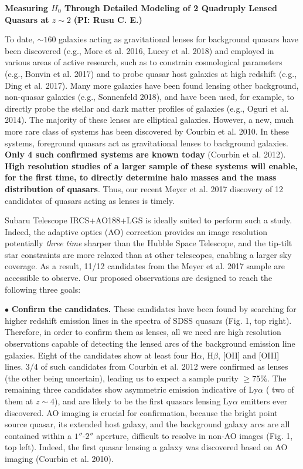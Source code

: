 \documentclass[a4paper,11pt]{article}
\begin{document}
\begin {centering}
{\bf Measuring $H_0$ Through Detailed Modeling of 2 Quadruply Lensed Quasars at $z\sim2$} {\bf (PI: Rusu C. E.)}\\
 \end{centering}
 
\medskip

To date, $\sim160$ galaxies acting as gravitational lenses for background quasars have been discovered (e.g., More et al. 2016, Lucey et al. 2018) and employed in various areas of active research, such as to constrain cosmological parameters (e.g., Bonvin et al. 2017) and to probe quasar host galaxies at high redshift (e.g., Ding et al. 2017). Many more galaxies have been found lensing other background, non-quasar galaxies (e.g., Sonnenfeld 2018), and have been used, for example, to directly probe the stellar and dark matter profiles of galaxies (e.g., Oguri et al. 2014). The majority of these lenses are elliptical galaxies. However, a new, much more rare class of systems has been discovered by Courbin et al. 2010. In these systems, foreground quasars act as gravitational lenses to background galaxies. {\bf Only 4 such confirmed systems are known today} (Courbin et al. 2012). {\bf High resolution studies of a larger sample of these systems will enable, for the first time, to directly determine halo masses and the mass distribution of quasars}. Thus, our recent Meyer et al. 2017 discovery  of 12 candidates of quasars acting as lenses is timely. 

Subaru Telescope IRCS+AO188+LGS is ideally suited to perform such a study. Indeed, the adaptive optics (AO) correction provides an image resolution potentially {\it three time} sharper than the Hubble Space Telescope, and the tip-tilt star constraints are more relaxed than at other telescopes, enabling a larger sky coverage. As a result, 11/12 candidates from the Meyer et al. 2017 sample are accessible to observe. Our proposed observations are designed to reach the following three goals:

$\bullet$ {\bf Confirm the candidates.} These candidates have been found by searching for higher redshift emission lines in the spectra of SDSS quasars (Fig. 1, top right). Therefore, in order to confirm them as lenses, all we need are high resolution observations capable of detecting the lensed arcs of the background emission line galaxies. Eight of the candidates show at least four H$\alpha$, H$\beta$, [OII] and [OIII] lines. 3/4 of such candidates from Courbin et al. 2012 were confirmed as lenses (the other being uncertain), leading us to expect a sample purity $\geq75\%$. The remaining three candidates show asymmetric emission indicative of Ly$\alpha$ ( two of them at $z\sim4$), and are likely to be the first quasars lensing Ly$\alpha$ emitters ever discovered. AO imaging is crucial for confirmation, because the bright point source quasar, its extended host galaxy, and the background galaxy arcs are all contained within a $1''$-$2''$ aperture, difficult to resolve in non-AO images (Fig. 1, top left). Indeed, the first quasar lensing a galaxy was discovered based on AO imaging (Courbin et al. 2010).
\end{document}
